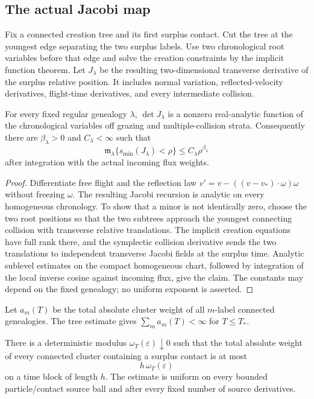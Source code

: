 \subsection{The actual Jacobi map}

Fix a connected creation tree and its first surplus contact.  Cut the tree at
the youngest edge separating the two surplus labels.  Use two chronological
root variables before that edge and solve the creation constraints by the
implicit function theorem.  Let $J_\lambda$ be the resulting two-dimensional
transverse derivative of the surplus relative position.  It includes normal
variation, reflected-velocity derivatives, flight-time derivatives, and every
intermediate collision.

\begin{lemma}
\label{lem:r12-b2-fixed}
For every fixed regular genealogy $\lambda$, $\det J_\lambda$ is a nonzero
real-analytic function of the chronological variables off grazing and
multiple-collision strata.  Consequently there are $\beta_\lambda>0$ and
$C_\lambda<\infty$ such that
\[
 \mathfrak m_\lambda\{s_{\min}(J_\lambda)<\rho\}
 \le C_\lambda\rho^{\beta_\lambda}
\]
after integration with the actual incoming flux weights.
\end{lemma}

\begin{proof}
Differentiate free flight and the reflection law
$v'=v-((v-v_*)\cdot\omega)\omega$ without freezing $\omega$.  The resulting
Jacobi recursion is analytic on every homogeneous chronology.  To show that a
minor is not identically zero, choose the two root positions so that the two
subtrees approach the youngest connecting collision with transverse relative
translations.  The implicit creation equations have full rank there, and the
symplectic collision derivative sends the two translations to independent
transverse Jacobi fields at the surplus time.  Analytic sublevel estimates on
the compact homogeneous chart, followed by integration of the local inverse
cosine against incoming flux, give the claim.  The constants may depend on the
fixed genealogy; no uniform exponent is asserted.
\end{proof}

Let $a_m(T)$ be the total absolute cluster weight of all $m$-label connected
genealogies.  The tree estimate gives
$\sum_m a_m(T)<\infty$ for $T\le T_*$.

\begin{theorem}
\label{thm:r12-b2-summed}
There is a deterministic modulus $\omega_T(\varepsilon)\downarrow0$ such that
the total absolute weight of every connected cluster containing a surplus
contact is at most
\[
 h\,\omega_T(\varepsilon)
\]
on a time block of length $h$.  The estimate is uniform on every bounded
particle/contact source ball and after every fixed number of source
derivatives.
\end{theorem}

